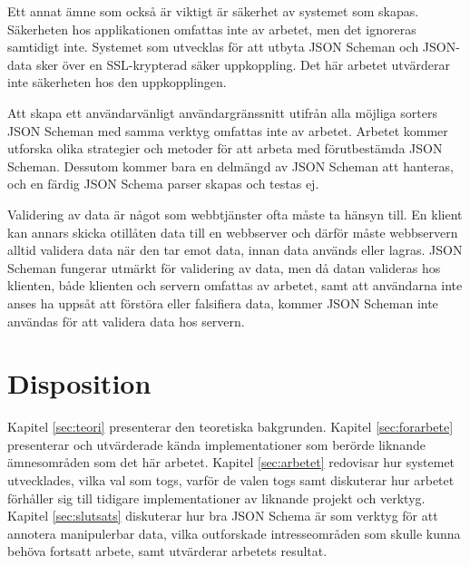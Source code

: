Ett annat ämne som också är viktigt är säkerhet av systemet som skapas. Säkerheten hos applikationen omfattas inte av arbetet, men det ignoreras samtidigt inte. Systemet som utvecklas för att utbyta JSON Scheman och JSON-data sker över en SSL-krypterad säker uppkoppling. Det här arbetet utvärderar inte säkerheten hos den uppkopplingen.

Att skapa ett användarvänligt användargränssnitt utifrån alla möjliga sorters JSON Scheman med samma verktyg omfattas inte av arbetet. Arbetet kommer utforska olika strategier och metoder för att arbeta med förutbestämda JSON Scheman. Dessutom kommer bara en delmängd av JSON Scheman att hanteras, och en färdig JSON Schema parser skapas och testas ej.

Validering av data är något som webbtjänster ofta måste ta hänsyn till. En klient kan annars skicka otillåten data till en webbserver och därför måste webbservern alltid validera data när den tar emot data, innan data används eller lagras. JSON Scheman fungerar utmärkt för validering av data, men då datan valideras hos klienten, både klienten och servern omfattas av arbetet, samt att användarna inte anses ha uppsåt att förstöra eller falsifiera data, kommer JSON Scheman inte användas för att validera data hos servern.

\section{Disposition}
\label{sec:intro:disposition}
Kapitel \ref{sec:teori} presenterar den teoretiska bakgrunden. Kapitel \ref{sec:forarbete} presenterar och utvärderade kända implementationer som berörde liknande ämnesområden som det här arbetet. Kapitel \ref{sec:arbetet} redovisar hur systemet utvecklades, vilka val som togs, varför de valen togs samt diskuterar hur arbetet förhåller sig till tidigare implementationer av liknande projekt och verktyg. Kapitel \ref{sec:slutsats} diskuterar hur bra JSON Schema är som verktyg för att annotera manipulerbar data, vilka outforskade intresseområden som skulle kunna behöva fortsatt arbete, samt utvärderar arbetets resultat.